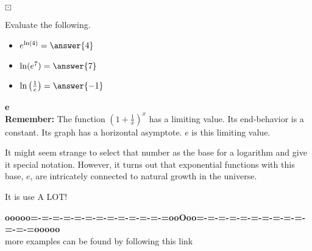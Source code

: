 \documentclass{ximera}
\begin{document}
\begin{question}$\boxdot$

Evaluate the following.

\begin{itemize}
\item $e^{\ln(4)} = \answer{4}$ 
\item $\ln(e^7) = \answer{7}$
\item $\ln\left( \frac{1}{e} \right) = \answer{-1}$
\end{itemize}



\end{question}



\begin{remark} \textbf{\textcolor{purple!85!blue}{e}} \\

\textbf{\textcolor{blue!55!black}{Remember:}} The function $\left( 1 + \frac{1}{x}  \right)^{x}$ has a limiting value.  Its end-behavior is a constant.  Its graph has a horizontal asymptote.  $e$ is this limiting value.

It might seem strange to select that number as the base for a logarithm and give it special notation.  However, it turns out that exponential functions with this base, $e$, are intricately connected to natural growth in the universe.

It is use A LOT!
\end{remark}










\begin{center}
\textbf{\textcolor{green!50!black}{ooooo=-=-=-=-=-=-=-=-=-=-=-=-=ooOoo=-=-=-=-=-=-=-=-=-=-=-=-=ooooo}} \\

more examples can be found by following this link\\ 

\end{center}
\end{document}
